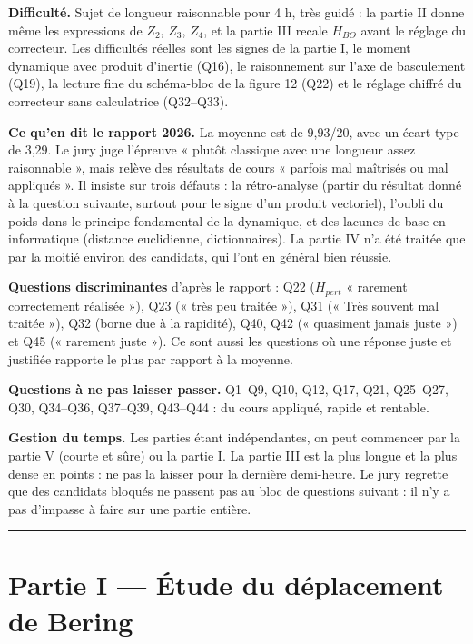 \documentclass[11pt,a4paper]{article}
\begin{document}
\textbf{Difficulté.} Sujet de longueur raisonnable pour 4 h, très guidé : la partie II donne même les expressions de \(Z_2\), \(Z_3\), \(Z_4\), et la partie III recale \(H_{BO}\) avant le réglage du correcteur. Les difficultés réelles sont les signes de la partie I, le moment dynamique avec produit d'inertie (Q16), le raisonnement sur l'axe de basculement (Q19), la lecture fine du schéma-bloc de la figure 12 (Q22) et le réglage chiffré du correcteur sans calculatrice (Q32--Q33).

\textbf{Ce qu'en dit le rapport 2026.} La moyenne est de 9,93/20, avec un écart-type de 3,29. Le jury juge l'épreuve « plutôt classique avec une longueur assez raisonnable », mais relève des résultats de cours « parfois mal maîtrisés ou mal appliqués ». Il insiste sur trois défauts : la rétro-analyse (partir du résultat donné à la question suivante, surtout pour le signe d'un produit vectoriel), l'oubli du poids dans le principe fondamental de la dynamique, et des lacunes de base en informatique (distance euclidienne, dictionnaires). La partie IV n'a été traitée que par la moitié environ des candidats, qui l'ont en général bien réussie.

\textbf{Questions discriminantes} d'après le rapport : Q22 (\(H_{pert}\) « rarement correctement réalisée »), Q23 (« très peu traitée »), Q31 (« Très souvent mal traitée »), Q32 (borne due à la rapidité), Q40, Q42 (« quasiment jamais juste ») et Q45 (« rarement juste »). Ce sont aussi les questions où une réponse juste et justifiée rapporte le plus par rapport à la moyenne.

\textbf{Questions à ne pas laisser passer.} Q1--Q9, Q10, Q12, Q17, Q21, Q25--Q27, Q30, Q34--Q36, Q37--Q39, Q43--Q44 : du cours appliqué, rapide et rentable.

\textbf{Gestion du temps.} Les parties étant indépendantes, on peut commencer par la partie V (courte et sûre) ou la partie I. La partie III est la plus longue et la plus dense en points : ne pas la laisser pour la dernière demi-heure. Le jury regrette que des candidats bloqués ne passent pas au bloc de questions suivant : il n'y a pas d'impasse à faire sur une partie entière.

\begin{center}\rule{0.5\linewidth}{0.5pt}\end{center}

\hypertarget{partie-i-uxe9tude-du-duxe9placement-de-bering}{%
\section{Partie I --- Étude du déplacement de Bering}\label{partie-i-uxe9tude-du-duxe9placement-de-bering}}
\end{document}
